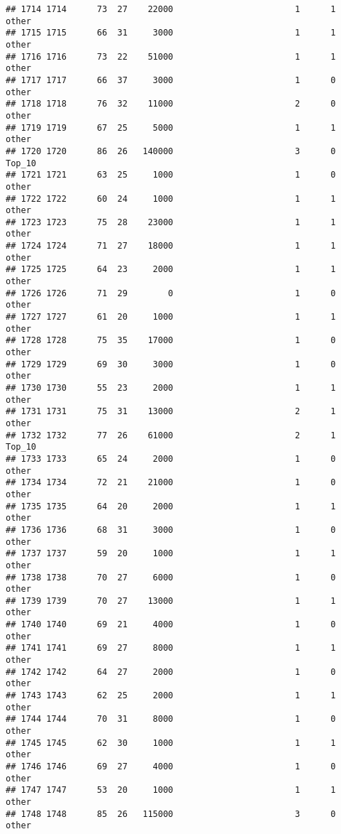 \documentclass[
]{article}
\begin{document}
\begin{verbatim}
## 1714 1714      73  27    22000                        1      1    other
## 1715 1715      66  31     3000                        1      1    other
## 1716 1716      73  22    51000                        1      1    other
## 1717 1717      66  37     3000                        1      0    other
## 1718 1718      76  32    11000                        2      0    other
## 1719 1719      67  25     5000                        1      1    other
## 1720 1720      86  26   140000                        3      0   Top_10
## 1721 1721      63  25     1000                        1      0    other
## 1722 1722      60  24     1000                        1      1    other
## 1723 1723      75  28    23000                        1      1    other
## 1724 1724      71  27    18000                        1      1    other
## 1725 1725      64  23     2000                        1      1    other
## 1726 1726      71  29        0                        1      0    other
## 1727 1727      61  20     1000                        1      1    other
## 1728 1728      75  35    17000                        1      0    other
## 1729 1729      69  30     3000                        1      0    other
## 1730 1730      55  23     2000                        1      1    other
## 1731 1731      75  31    13000                        2      1    other
## 1732 1732      77  26    61000                        2      1   Top_10
## 1733 1733      65  24     2000                        1      0    other
## 1734 1734      72  21    21000                        1      0    other
## 1735 1735      64  20     2000                        1      1    other
## 1736 1736      68  31     3000                        1      0    other
## 1737 1737      59  20     1000                        1      1    other
## 1738 1738      70  27     6000                        1      0    other
## 1739 1739      70  27    13000                        1      1    other
## 1740 1740      69  21     4000                        1      0    other
## 1741 1741      69  27     8000                        1      1    other
## 1742 1742      64  27     2000                        1      0    other
## 1743 1743      62  25     2000                        1      1    other
## 1744 1744      70  31     8000                        1      0    other
## 1745 1745      62  30     1000                        1      1    other
## 1746 1746      69  27     4000                        1      0    other
## 1747 1747      53  20     1000                        1      1    other
## 1748 1748      85  26   115000                        3      0    other

\end{verbatim}
\end{document}

